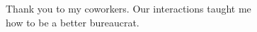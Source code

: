 \thispagestyle{empty}

\noindent Thank you to my coworkers. Our interactions taught me \\how to be a better bureaucrat.